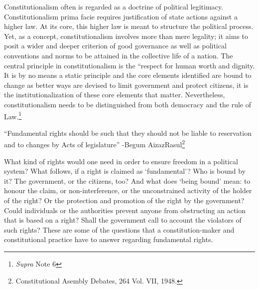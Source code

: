 \begin{multicols}{2}
\vspace{-.15cm}


\vspace{-.15cm}

\noi
Constitutionalism often is regarded as a doctrine of political legitimacy. Constitutionalism
prima facie requires justification of state actions against a higher law. At its core, this higher
law is meant to structure the political process. Yet, as a concept, constitutionalism involves
more than mere legality; it aims to posit a wider and deeper criterion of good governance as
well as political conventions and norms to be attained in the collective life of a nation. The  central principle in constitutionalism is the “respect for human worth and dignity. It is by no
means a static principle and the core elements identified are bound to change as better ways
are devised to limit government and protect citizens, it is the institutionalization of these core
elements that matter. Nevertheless, constitutionalism needs to be distinguished from both
democracy and the rule of Law.\footnote{\textit{Supra} Note 6}

\vspace{.5cm}



\vspace{-.35cm}

\noi
\begin{quoting}
“Fundamental rights should be such that they should not be liable to
reservation and to changes by Acts of legislature” -Begum AizazRasul\footnote{Constitutional Asembly Debates, 264 Vol. VII, 1948.}
\end{quoting}

\vspace{-.35cm}

\noi
What kind of rights would one need in order to ensure freedom in a political system? What
follows, if a right is claimed as ‘fundamental’? Who is bound by it? The government, or the
citizens, too? And what does ‘being bound’ mean: to honour the claim, or non-interference,
or the unconstrained activity of the holder of the right? Or the protection and promotion of
the right by the government? Could individuals or the authorities prevent anyone from
obstructing an action that is based on a right? Shall the government call to account the
violators of such rights? These are some of the questions that a constitution-maker and
constitutional practice have to answer regarding fundamental rights.


\end{multicols}
